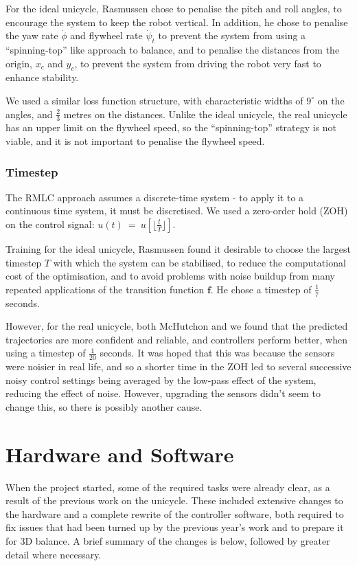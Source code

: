 \documentclass{IIBproject}
\begin{document}
For the ideal unicycle, Rasmussen chose to penalise the pitch and roll angles,
to encourage the system to keep the robot vertical.  In addition, he chose to
penalise the yaw rate $\dot{\phi}$ and flywheel rate $\dot{\psi}_t$ to prevent
the system from using a ``spinning-top'' like approach to balance, and to
penalise the distances from the origin, $x_c$ and $y_c$, to prevent the system
from driving the robot very fast to enhance stability.

We used a similar loss function structure, with characteristic widths of
$9^\circ$ on the angles, and $\frac{2}{3}$ metres on the distances.  Unlike
the ideal unicycle, the real unicycle has an upper limit on the flywheel
speed, so the ``spinning-top'' strategy is not viable, and it is not important
to penalise the flywheel speed.

\subsubsection{Timestep}
\label{sec:timestep}

The RMLC approach assumes a discrete-time system - to apply it to a continuous
time system, it must be discretised. We used a zero-order hold (ZOH) on the
control signal: $u(t)~=~u[\lfloor\frac{t}{T}\rfloor]$.

Training for the ideal unicycle, Rasmussen found it desirable to choose the
largest timestep $T$ with which the system can be stabilised, to reduce the
computational cost of the optimisation, and to avoid problems with noise
buildup from many repeated applications of the transition function
$\boldsymbol{f}$. He chose a timestep of $\frac{1}{7}$ seconds.

However, for the real unicycle, both McHutchon and we found that the predicted
trajectories are more confident and reliable, and controllers perform better,
when using a timestep of $\frac{1}{20}$ seconds. It was hoped that this was
because the sensors were noisier in real life, and so a shorter time in the
ZOH led to several successive noisy control settings being averaged by the
low-pass effect of the system, reducing the effect of noise. However,
upgrading the sensors didn't seem to change this, so there is possibly another
cause.

\section{Hardware and Software}

When the project started, some of the required tasks were already clear, as a
result of the previous work on the unicycle. These included extensive changes
to the hardware and a complete rewrite of the controller software, both
required to fix issues that had been turned up by the previous year's work
and to prepare it for 3D balance. A brief summary of the changes is below,
followed by greater detail where necessary.
\end{document}
